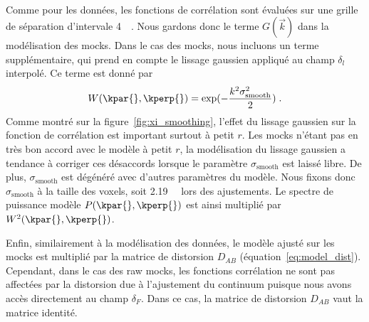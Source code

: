 \paragraph{}
Comme pour les données, les fonctions de corrélation sont évaluées sur une grille de séparation d'intervale \SI{4}{\perh\Mpc}. Nous gardons donc le terme $G(\vec k)$ dans la modélisation des mocks.
Dans le cas des mocks, nous incluons un terme supplémentaire, qui prend en compte le lissage gaussien appliqué au champ $\delta_l$ interpolé. Ce terme est donné par
\begin{equation}
  W(\kpar{}, \kperp{}) = \exp(- \frac{k^2 \sigma_{\mathrm{smooth}}^2}{2}) \; .
\end{equation}
Comme montré sur la figure~\ref{fig:xi_smoothing}, l'effet du lissage gaussien sur la fonction de corrélation est important surtout à petit $r$. Les mocks n'étant pas en très bon accord avec le modèle à petit $r$, %
  la modélisation du lissage gaussien a tendance à corriger ces désaccords lorsque le paramètre $\sigma_{\mathrm{smooth}}$ est laissé libre.
  De plus, $\sigma_{\mathrm{smooth}}$ est dégénéré avec d'autres paramètres du modèle.
  Nous fixons donc $\sigma_{\mathrm{smooth}}$ à la taille des voxels, soit \SI{2.19}{\perh\Mpc} lors des ajustements.
Le spectre de puissance modèle $P(\kpar{}, \kperp{})$ est ainsi multiplié par $W^2(\kpar{}, \kperp{})$.

Enfin, similairement à la modélisation des données, le modèle ajusté sur les mocks est multiplié par la matrice de distorsion $D_{AB}$ (équation~\ref{eq:model_dist}). Cependant, dans le cas des raw mocks, les fonctions corrélation ne sont pas affectées par la distorsion due à l'ajustement du continuum puisque nous avons accès directement au champ $\delta_F$. Dans ce cas, la matrice de distorsion $D_{AB}$ vaut la matrice identité.


